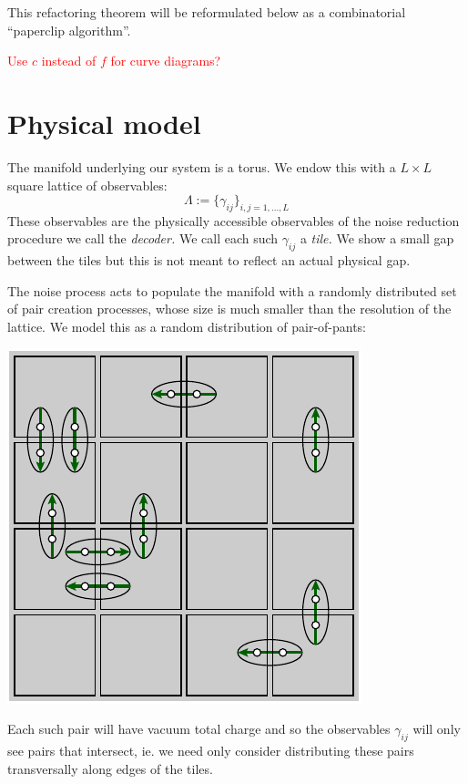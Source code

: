 \documentclass[aps, prl, letterpaper, twocolumn, superscriptaddress, notitlepage, 10pt]{revtex4-1}
\newcommand{\simon}[1]{\textcolor{red}{#1}}
\begin{document}
This refactoring theorem will be reformulated 
below as a combinatorial ``paperclip algorithm''.

\simon{Use $c$ instead of $f$ for curve diagrams?}

%
%

\section{Physical model}

The manifold underlying our system is a torus.
We endow this with a $L\times L$ square lattice of observables:
$$
    \Lambda := \bigl\{ \gamma_{ij} \bigr\}_{i,j=1,...,L}
$$
These observables are the physically accessible observables of
the noise reduction procedure we call the \emph{decoder.}
We call each such $\gamma_{ij}$ a \emph{tile.}
We show a small gap between the tiles but this is not meant
to reflect an actual physical gap.

The noise process acts to populate the manifold with
a randomly distributed set of pair creation processes,
whose size is much smaller than the resolution of the lattice.
We model this as a random distribution of pair-of-pants:
\begin{center}
\includegraphics[]{pic-pair-create.pdf}
\end{center}

Each such pair will have vacuum total charge and so the observables
$\gamma_{ij}$ will only see pairs that intersect, ie. we
need only consider distributing these pairs
transversally along edges of the tiles.
\end{document}
